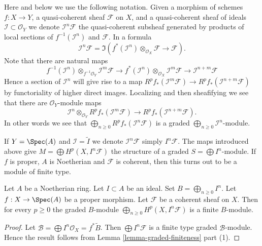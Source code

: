 \medskip\noindent
Here and below we use the following notation.
Given a morphism of schemes $f : X \to Y$, a quasi-coherent sheaf
$\mathcal{F}$ on $X$, and a quasi-coherent sheaf of ideals
$\mathcal{I} \subset \mathcal{O}_Y$ we denote
$\mathcal{I}^n\mathcal{F}$ the quasi-coherent subsheaf generated
by products of local sections of $f^{-1}(\mathcal{I}^n)$ and
$\mathcal{F}$. In a formula
$$
\mathcal{I}^n\mathcal{F}
=
\Im\left(
f^*(\mathcal{I}^n) \otimes_{\mathcal{O}_X} \mathcal{F}
\longrightarrow
\mathcal{F}
\right).
$$
Note that there are natural maps
$$
f^{-1}(\mathcal{I}^n) \otimes_{f^{-1}\mathcal{O}_Y} \mathcal{I}^m\mathcal{F}
\longrightarrow
f^*(\mathcal{I}^n) \otimes_{\mathcal{O}_X} \mathcal{I}^m\mathcal{F}
\longrightarrow
\mathcal{I}^{n + m}\mathcal{F}
$$
Hence a section of $\mathcal{I}^n$ will give rise to a
map $R^pf_*(\mathcal{I}^m\mathcal{F}) \to
R^pf_*(\mathcal{I}^{n + m}\mathcal{F})$ by functoriality
of higher direct images. Localizing and then sheafifying we
see that there are $\mathcal{O}_Y$-module maps
$$
\mathcal{I}^n \otimes_{\mathcal{O}_Y} R^pf_*(\mathcal{I}^m\mathcal{F})
\longrightarrow
R^pf_*(\mathcal{I}^{n + m}\mathcal{F}).
$$
In other words we see that
$\bigoplus_{n \geq 0} R^pf_*(\mathcal{I}^n\mathcal{F})$
is a graded $\bigoplus_{n \geq 0} \mathcal{I}^n$-module.

\medskip\noindent
If $Y = \Spec(A)$ and $\mathcal{I} = \widetilde{I}$ we denote
$\mathcal{I}^n\mathcal{F}$ simply $I^n\mathcal{F}$. The maps
introduced above give $M = \bigoplus H^p(X, I^n\mathcal{F})$ the
structure of a graded $S = \bigoplus I^n$-module. If $f$ is proper,
$A$ is Noetherian and $\mathcal{F}$ is coherent, then this turns out
to be a module of finite type.

\begin{lemma}
\label{lemma-cohomology-powers-ideal-times-F}
Let $A$ be a Noetherian ring.
Let $I \subset A$ be an ideal.
Set $B = \bigoplus_{n \geq 0} I^n$.
Let $f : X \to \Spec(A)$ be a proper morphism.
Let $\mathcal{F}$ be a coherent sheaf on $X$.
Then for every $p \geq 0$ the graded $B$-module
$\bigoplus_{n \geq 0} H^p(X, I^n\mathcal{F})$ is
a finite $B$-module.
\end{lemma}

\begin{proof}
Let $\mathcal{B} = \bigoplus I^n\mathcal{O}_X = f^*\widetilde{B}$.
Then $\bigoplus I^n\mathcal{F}$ is a finite type
graded $\mathcal{B}$-module. Hence the result follows
from Lemma \ref{lemma-graded-finiteness} part (1).
\end{proof}

